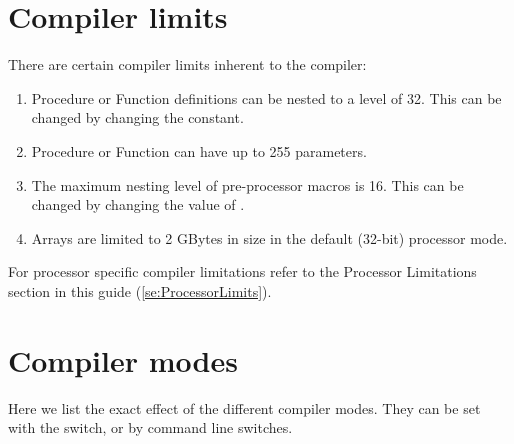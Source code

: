 
\chapter{Compiler limits}
\label{ch:AppC}
There are certain compiler limits inherent to the compiler:
\begin{enumerate}
\item Procedure or Function definitions can be nested to a level of 32. This
can be changed by changing the  constant.
\item Procedure or Function can have up to 255 parameters.
\item The maximum nesting level of pre-processor macros is 16. This can be
changed by changing the value of .
\item Arrays are limited to 2 GBytes in size in the default (32-bit) 
processor mode.
\end{enumerate}

For processor specific compiler limitations refer to the Processor
Limitations section in this guide (\ref{se:ProcessorLimits}).

\chapter{Compiler modes}
\label{ch:AppD}

Here we list the exact effect of the different compiler modes. They can be
set with the  switch, or by command line switches.

